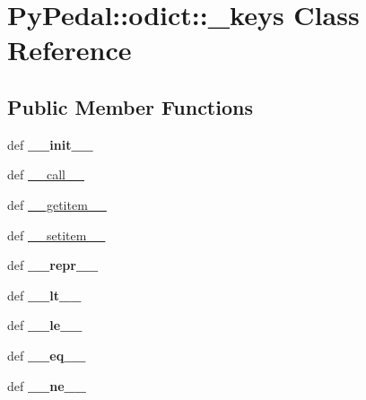 \hypertarget{classPyPedal_1_1odict_1_1__keys}{
\section{PyPedal::odict::\_\-keys Class Reference}
\label{classPyPedal_1_1odict_1_1__keys}
}
\subsection*{Public Member Functions}
\begin{CompactItemize}
\item 
\hypertarget{classPyPedal_1_1odict_1_1__keys_a8e075fc096411272b9d112f91a3b269}{
def \textbf{\_\-\_\-init\_\-\_\-}}
\label{classPyPedal_1_1odict_1_1__keys_a8e075fc096411272b9d112f91a3b269}

\item 
def \hyperlink{classPyPedal_1_1odict_1_1__keys_8f9e87e413cc7be14a78f925d4161cf7}{\_\-\_\-call\_\-\_\-}
\item 
def \hyperlink{classPyPedal_1_1odict_1_1__keys_d24179317d2b9b3637aa389a2cd0db4c}{\_\-\_\-getitem\_\-\_\-}
\item 
def \hyperlink{classPyPedal_1_1odict_1_1__keys_98a66ca0916d9cd98933b5b4fdb3018f}{\_\-\_\-setitem\_\-\_\-}
\item 
\hypertarget{classPyPedal_1_1odict_1_1__keys_ddfd65e199f7cdc78a905eda5d9074aa}{
def \textbf{\_\-\_\-repr\_\-\_\-}}
\label{classPyPedal_1_1odict_1_1__keys_ddfd65e199f7cdc78a905eda5d9074aa}

\item 
\hypertarget{classPyPedal_1_1odict_1_1__keys_ff1c5b797b2605035dd4cbd82de45698}{
def \textbf{\_\-\_\-lt\_\-\_\-}}
\label{classPyPedal_1_1odict_1_1__keys_ff1c5b797b2605035dd4cbd82de45698}

\item 
\hypertarget{classPyPedal_1_1odict_1_1__keys_344b10f355016bbc0985720329bded2e}{
def \textbf{\_\-\_\-le\_\-\_\-}}
\label{classPyPedal_1_1odict_1_1__keys_344b10f355016bbc0985720329bded2e}

\item 
\hypertarget{classPyPedal_1_1odict_1_1__keys_ccee5b2014b576a4eda2486d135c7594}{
def \textbf{\_\-\_\-eq\_\-\_\-}}
\label{classPyPedal_1_1odict_1_1__keys_ccee5b2014b576a4eda2486d135c7594}

\item 
\hypertarget{classPyPedal_1_1odict_1_1__keys_7f4c4c4ccd84bc06efb5de41ac1c0013}{
def \textbf{\_\-\_\-ne\_\-\_\-}}
\label{classPyPedal_1_1odict_1_1__keys_7f4c4c4ccd84bc06efb5de41ac1c0013}


\end{CompactItemize}
